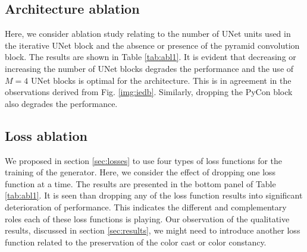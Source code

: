 \documentclass[runningheads]{llncs}
\begin{document}
\subsection{Architecture ablation} \label{sec:unet_experiment}

Here, we consider ablation study relating to the number of UNet units used in the iterative UNet block and the absence or presence of the pyramid convolution block. The results are shown in Table \ref{tab:abl1}. It is evident that decreasing or increasing the number of UNet blocks degrades the performance and the use of $M=4$ UNet blocks is optimal for the architecture. This is in agreement in the observations derived from Fig. \ref{img:iedb}. Similarly, dropping the PyCon block also degrades the performance. 

\subsection{Loss ablation} \label{sec:losses_experiment}
We proposed in section \ref{sec:losses} to use four types of loss functions for the training of the generator. Here, we consider the effect of dropping one loss function at a time. The results are presented in the bottom panel of Table \ref{tab:abl1}. It is seen than dropping any of the loss function results into significant deterioration of performance. This indicates the different and complementary roles each of these loss functions is playing. Our observation of the qualitative results, discussed in section \ref{sec:results}, we might need to introduce another loss function related to the preservation of the color cast or color constancy.
\end{document}
